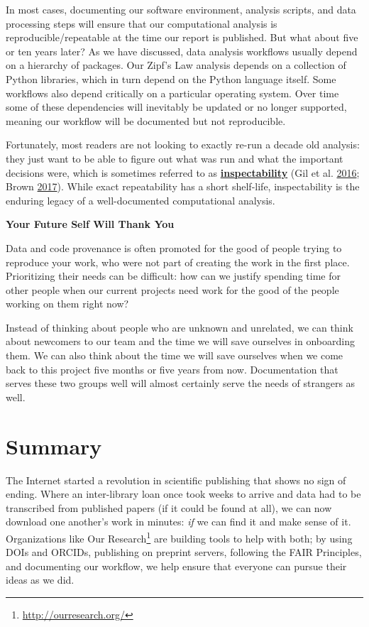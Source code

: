 \documentclass[
]{krantz}
\renewenvironment{quote}{\begin{VF}}{\end{VF}}
\renewcommand{\href}[2]{#2\footnote{\url{#1}}}
\newcommand{\gref}[2]{\hyperlink{#2}{\textbf{#1}}}
\begin{document}
In most cases,
documenting our software environment, analysis scripts, and data processing steps
will ensure that our computational analysis is reproducible/repeatable
at the time our report is published.
But what about five or ten years later?
As we have discussed,
data analysis workflows usually depend on a hierarchy of packages.
Our Zipf's Law analysis depends on a collection of Python libraries,
which in turn depend on the Python language itself.
Some workflows also depend critically on a particular operating system.
Over time some of these dependencies will inevitably be updated or no longer supported,
meaning our workflow will be documented but not reproducible.

Fortunately,
most readers are not looking to exactly re-run a decade old analysis:
they just want to be able to figure out what was run
and what the important decisions were,
which is sometimes referred to as \gref{inspectability}{inspectability}
(Gil et al. \protect\hyperlink{ref-Gil2016}{2016}; Brown \protect\hyperlink{ref-Brown2017}{2017}).
While exact repeatability has a short shelf-life,
inspectability is the enduring legacy of a well-documented computational analysis.

\begin{quote}
\textbf{Your Future Self Will Thank You}

Data and code provenance is often promoted for the good of people
trying to reproduce your work,
who were not part of creating the work in the first place.
Prioritizing their needs can be difficult:
how can we justify spending time for other people
when our current projects need work for the good of the people working on them right now?

Instead of thinking about people who are unknown and unrelated,
we can think about newcomers to our team
and the time we will save ourselves in onboarding them.
We can also think about the time we will save ourselves
when we come back to this project five months or five years from now.
Documentation that serves these two groups well
will almost certainly serve the needs of strangers as well.
\end{quote}

\hypertarget{provenance-summary}{%
\section{Summary}\label{provenance-summary}}

The Internet started a revolution in scientific publishing
that shows no sign of ending.
Where an inter-library loan once took weeks to arrive
and data had to be transcribed from published papers
(if it could be found at all),
we can now download one another's work in minutes:
\emph{if} we can find it and make sense of it.
Organizations like \href{http://ourresearch.org/}{Our Research} are building tools to help with both;
by using DOIs and ORCIDs,
publishing on preprint servers,
following the FAIR Principles,
and documenting our workflow,
we help ensure that everyone can pursue their ideas as we did.
\end{document}
